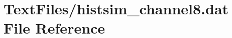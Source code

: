 \hypertarget{TextFiles_2histsim__channel8_8dat}{}\section{Text\+Files/histsim\+\_\+channel8.dat File Reference}
\label{TextFiles_2histsim__channel8_8dat}
